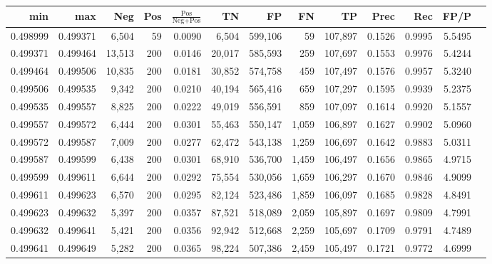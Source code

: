 \begin{tabular}{rrrrrrrrrrrrr}
\toprule
     min &      max &    Neg & Pos & $\frac{\text{Pos}}{\text{Neg}+\text{Pos}}$ &      TN &      FP &      FN &      TP &   Prec &    Rec &   FP/P \\
\midrule
0.498999 & 0.499371 &  6,504 &  59 &                                     0.0090 &   6,504 & 599,106 &      59 & 107,897 & 0.1526 & 0.9995 & 5.5495 \\
0.499371 & 0.499464 & 13,513 & 200 &                                     0.0146 &  20,017 & 585,593 &     259 & 107,697 & 0.1553 & 0.9976 & 5.4244 \\
0.499464 & 0.499506 & 10,835 & 200 &                                     0.0181 &  30,852 & 574,758 &     459 & 107,497 & 0.1576 & 0.9957 & 5.3240 \\
0.499506 & 0.499535 &  9,342 & 200 &                                     0.0210 &  40,194 & 565,416 &     659 & 107,297 & 0.1595 & 0.9939 & 5.2375 \\
0.499535 & 0.499557 &  8,825 & 200 &                                     0.0222 &  49,019 & 556,591 &     859 & 107,097 & 0.1614 & 0.9920 & 5.1557 \\
0.499557 & 0.499572 &  6,444 & 200 &                                     0.0301 &  55,463 & 550,147 &   1,059 & 106,897 & 0.1627 & 0.9902 & 5.0960 \\
0.499572 & 0.499587 &  7,009 & 200 &                                     0.0277 &  62,472 & 543,138 &   1,259 & 106,697 & 0.1642 & 0.9883 & 5.0311 \\
0.499587 & 0.499599 &  6,438 & 200 &                                     0.0301 &  68,910 & 536,700 &   1,459 & 106,497 & 0.1656 & 0.9865 & 4.9715 \\
0.499599 & 0.499611 &  6,644 & 200 &                                     0.0292 &  75,554 & 530,056 &   1,659 & 106,297 & 0.1670 & 0.9846 & 4.9099 \\
0.499611 & 0.499623 &  6,570 & 200 &                                     0.0295 &  82,124 & 523,486 &   1,859 & 106,097 & 0.1685 & 0.9828 & 4.8491 \\
0.499623 & 0.499632 &  5,397 & 200 &                                     0.0357 &  87,521 & 518,089 &   2,059 & 105,897 & 0.1697 & 0.9809 & 4.7991 \\
0.499632 & 0.499641 &  5,421 & 200 &                                     0.0356 &  92,942 & 512,668 &   2,259 & 105,697 & 0.1709 & 0.9791 & 4.7489 \\
0.499641 & 0.499649 &  5,282 & 200 &                                     0.0365 &  98,224 & 507,386 &   2,459 & 105,497 & 0.1721 & 0.9772 & 4.6999 \\

\end{tabular}
